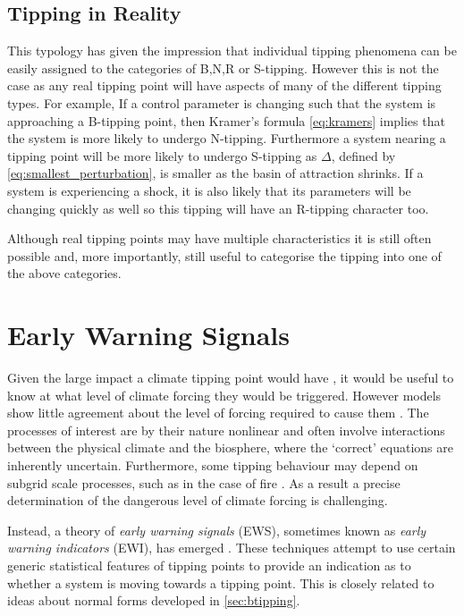 \subsection{Tipping in Reality}
This typology has given the impression that individual tipping phenomena can be easily assigned to the categories of B,N,R or S-tipping. However this is not the case as any
real tipping point will have aspects of many of the different tipping types. For example, If a control parameter is changing such that the system is approaching a B-tipping point,
then Kramer's formula \cref{eq:kramers} implies that the system is more likely to undergo N-tipping. Furthermore a system nearing a tipping point will be more likely to undergo S-tipping as
$\Delta$, defined by \cref{eq:smallest_perturbation}, is smaller as the basin of attraction shrinks. If a system is experiencing a shock, it is also likely that its parameters will
be changing quickly as well so this tipping will have an R-tipping character too.

Although real tipping points may have multiple characteristics it is still often possible and, more importantly, still useful to categorise the tipping into one of the above categories.


\section{Early Warning Signals}
Given the large impact a climate tipping point would have \parencite{Lenton2019a}, it would be useful to know at what level of climate forcing they would be triggered.
However models show little agreement about the level of forcing required to cause them \parencite{Drijfhout2015}. The processes of interest are by their nature
nonlinear and often involve interactions between the physical climate and the biosphere, where the `correct' equations are inherently uncertain. Furthermore,
some tipping behaviour may depend on subgrid scale processes, such as in the case of fire \parencite{Mangeon2016}. As a result a precise determination of the dangerous level of climate
forcing is challenging.

Instead, a theory of \emph{early warning signals} (EWS), sometimes known as  \emph{early warning indicators} (EWI), has emerged \parencite{Dakos2008,Scheffer2009,Lenton2011,Williamson2015}.
These techniques attempt to use certain generic statistical features of tipping points to provide an indication as to whether a system is
moving towards a tipping point. This is closely related to ideas about normal forms developed in \cref{sec:btipping}.

